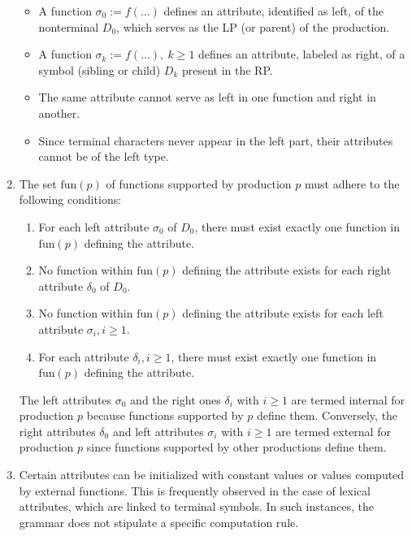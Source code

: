 \begin{enumerate}
\begin{itemize}
            \item A function $\sigma_0 := f(\ldots)$ defines an attribute, identified as left, of the nonterminal $D_0$, which serves as the LP (or parent) of the production.
            \item A function $\sigma_k := f(\ldots), \ k \geq 1$ defines an attribute, labeled as right, of a symbol (sibling or child) $D_k$ present in the RP.
            \item The same attribute cannot serve as left in one function and right in another.
            \item Since terminal characters never appear in the left part, their attributes cannot be of the left type.
        \end{itemize}
    \item The set $\text{fun}(p)$ of functions supported by production $p$ must adhere to the following conditions:
        \begin{enumerate}
            \item For each left attribute $\sigma_0$ of $D_0$, there must exist exactly one function in $\text{fun}(p)$ defining the attribute.
            \item No function within $\text{fun}(p)$ defining the attribute exists for each right attribute $\delta_0$ of $D_0$.
            \item No function within $\text{fun}(p)$ defining the attribute exists for each left attribute $\sigma_i, i \geq 1$.
            \item For each attribute $\delta_i, i \geq 1$, there must exist exactly one function in $\text{fun}(p)$ defining the attribute.
        \end{enumerate}
        The left attributes $\sigma_0$ and the right ones $\delta_i$ with $i \geq 1$ are termed internal for production $p$ because functions supported by $p$ define them. 
        Conversely, the right attributes $\delta_0$ and left attributes $\sigma_i$ with $i \geq 1$ are termed external for production $p$ since functions supported by other productions define them.    
    \item Certain attributes can be initialized with constant values or values computed by external functions. 
        This is frequently observed in the case of lexical attributes, which are linked to terminal symbols. 
        In such instances, the grammar does not stipulate a specific computation rule.
\end{enumerate}

